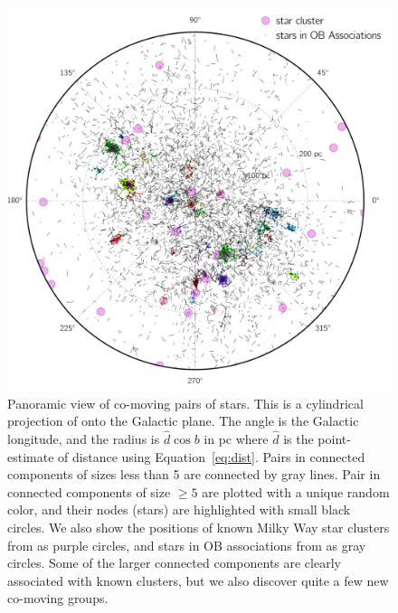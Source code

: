 \documentclass[manuscript, letterpaper]{aastex6}
\begin{document}
\begin{figure}[htbp]
  \begin{center}
    \includegraphics[width=\textwidth]{figures/glon_d_pie.pdf}
  \end{center}
  \caption{%
    Panoramic view of co-moving pairs of stars. This is a cylindrical
    projection of onto the Galactic plane. The angle is the Galactic
    longitude, and the radius is $\hat d\cos b$ in pc where $\hat d$ is the point-estimate
    of distance using Equation~\ref{eq:dist}.
    Pairs in connected components of sizes less than 5 are connected by gray lines.
    Pair in connected components of size $\geq 5$ are plotted with a unique random color,
    and their nodes (stars) are highlighted with small black circles.
    We also show the positions of known Milky Way star clusters
    from \citet{Kharchenko:2016aa} as purple circles,
    and stars in OB associations from \citet{de-Zeeuw:1999aa} as
    gray circles.
    Some of the larger connected components are clearly associated with known
    clusters, but we also discover quite a few new co-moving groups.
    \label{fig:glon_d_pairlines}}
\end{figure}
\end{document}
